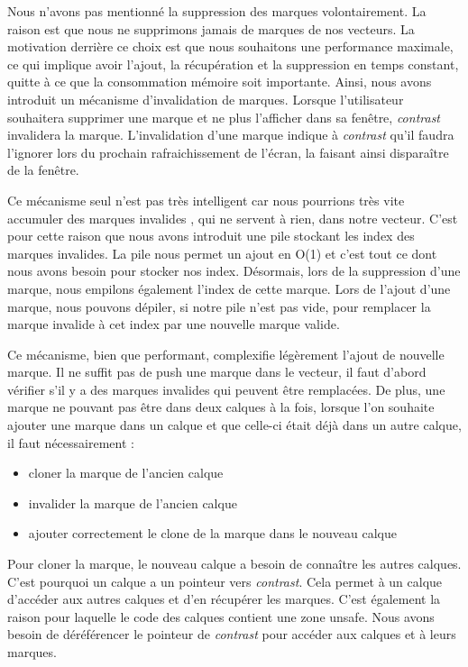 \documentclass[12pt]{article}
\begin{document}
Nous n'avons pas mentionné la suppression des marques volontairement. La raison est que nous ne supprimons
jamais de marques de nos vecteurs. La motivation derrière ce choix est que nous souhaitons une performance
maximale, ce qui implique avoir l'ajout, la récupération et la suppression en temps constant, quitte à
ce que la consommation mémoire soit importante.
Ainsi, nous avons introduit un mécanisme d'invalidation de marques. Lorsque l'utilisateur souhaitera
supprimer une marque et ne plus l'afficher dans sa fenêtre, \textit{contrast} invalidera la marque.
L'invalidation d'une marque indique à \textit{contrast} qu'il faudra l'ignorer lors du prochain
rafraichissement de l'écran, la faisant ainsi disparaître de la fenêtre.

Ce mécanisme seul n'est pas très intelligent car nous pourrions très vite accumuler des marques invalides
, qui ne servent à rien, dans notre vecteur.
C'est pour cette raison que nous avons introduit une pile stockant les index des marques invalides.
La pile nous permet un ajout en O(1) et c'est tout ce dont nous avons besoin pour stocker nos index.
Désormais, lors de la suppression d'une marque, nous empilons également l'index de cette marque.
Lors de l'ajout d'une marque, nous pouvons dépiler, si notre pile n'est pas vide, pour remplacer la
marque invalide à cet index par une nouvelle marque valide.

Ce mécanisme, bien que performant, complexifie légèrement l'ajout de nouvelle marque. Il ne suffit pas de
push une marque dans le vecteur, il faut d'abord vérifier s'il y a des marques invalides qui peuvent être
remplacées.
De plus, une marque ne pouvant pas être dans deux calques à la fois, lorsque l'on souhaite ajouter une
marque dans un calque et que celle-ci était déjà dans un autre calque, il faut nécessairement :
\begin{itemize}
\item cloner la marque de l'ancien calque
\item invalider la marque de l'ancien calque
\item ajouter correctement le clone de la marque dans le nouveau calque
\end{itemize}
Pour cloner la marque, le nouveau calque a besoin de connaître les autres calques. C'est pourquoi un
calque a un pointeur vers \textit{contrast}. Cela permet à un calque d'accéder aux autres calques et d'en
récupérer les  marques. C'est également la raison pour laquelle le code des calques contient une zone
\gls{unsafe}. Nous avons besoin de déréférencer le pointeur de \textit{contrast} pour accéder aux calques et à
leurs marques.
\end{document}
